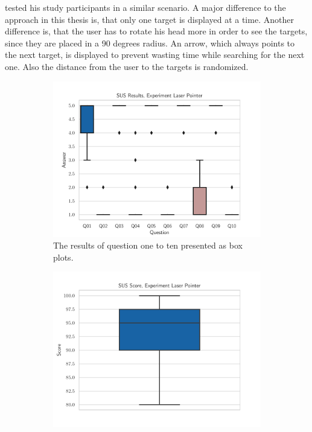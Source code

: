 
\citeauthor{Kamm.2018} tested his study participants in a similar scenario. A major difference to the approach in this thesis is, that only one target is displayed at a time. Another difference is, that the user has to rotate his head more in order to see the targets, since they are placed in a 90 degrees radius. An arrow, which always points to the next target, is displayed to prevent wasting time while searching for the next one. Also the distance from the user to the targets is randomized. %




\begin{figure}[H]
  \centering
  \begin{subfigure}{.45\textwidth}%
    \centering
    \includegraphics[width=\textwidth]{figures/evaluation/res_exp_lp.pdf}
    \caption{The results of question one to ten presented as box plots.}\label{fig:res-exp-lp}
  \end{subfigure}%
  \hspace{0.1\textwidth}%
  \begin{subfigure}{.45\textwidth}%
    \centering
    \includegraphics[width=\textwidth]{figures/evaluation/score_exp_lp.pdf}

\end{subfigure}
\end{figure}
